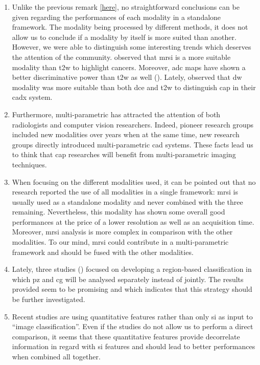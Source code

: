 {\begin{enumerate}
	\item Unlike the previous remark \ref{here}, no straightforward conclusions can be given regarding the performances of each modality in a standalone framework. The modality being processed by different methods, it does not allow us to conclude if a modality by itself is more suited than another. However, we were able to distinguish some interesting trends which deserves the attention of the community. \cite{Tiwari2009a,Tiwari2012,Tiwari2013} observed that \ac{mrsi} is a more suitable modality than \ac{t2w} to highlight cancers. Moreover, \ac{adc} maps have shown a better discriminative power than \ac{t2w} as well (\cite{Langer2009,Viswanath2011,Peng2013}). Lately, \cite{Litjens2014} observed that \ac{dw} modality was more suitable than both \ac{dce} and \ac{t2w} to distinguish \ac{cap} in their \ac{cadx} system. 

	\item Furthermore, multi-parametric has attracted the attention of both radiologists and computer vision researchers. Indeed, pioneer research groups included new modalities over years when at the same time, new research groups directly introduced multi-parametric \ac{cad} systems. These facts lead us to think that \ac{cap} researches will benefit from multi-parametric imaging techniques.

	\item When focusing on the different modalities used, it can be pointed out that no research reported the use of all modalities in a single framework: \ac{mrsi} is usually used as a standalone modality and never combined with the three remaining. Nevertheless, this modality has shown some overall good performances at the price of a lower resolution as well as an acquisition time. Moreover, \ac{mrsi} analysis is more complex in comparison with the other modalities. To our mind, \ac{mrsi} could contribute in a multi-parametric framework and should be fused with the other modalities.

	\item Lately, three studies (\cite{Viswanath2012,Litjens2012,Litjens2014}) focused on developing a region-based classification in which \ac{pz} and \ac{cg} will be analysed separately instead of jointly. The results provided seem to be promising and which indicates that this strategy should be further investigated.
	
	\item Recent studies are using quantitative features rather than only \ac{si} as input to ``image classification''. Even if the studies do not allow us to perform a direct comparison, it seems that these quantitative features provide decorrelate information in regard with \ac{si} features and should lead to better performances when combined all together. 
	

\end{enumerate}}

